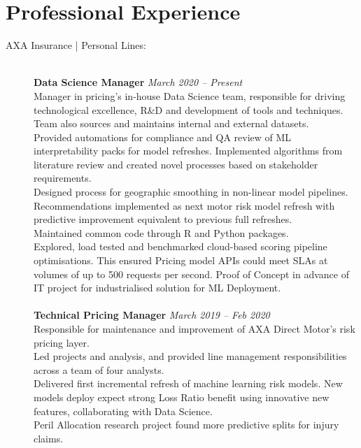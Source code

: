 \documentclass[11pt]{article}
\begin{document}
\section*{Professional Experience}
\begin{description}

\item[AXA Insurance | Personal Lines:] \hspace{1mm} \\
\textbf{Data Science Manager} \emph{March 2020 -- Present}\\
\textbullet \quad Manager in pricing's in-house Data Science team, responsible for driving technological excellence, R\&D and development of tools and techniques. Team also sources and maintains internal and external datasets. \\
\textbullet \quad Provided automations for compliance and QA review of ML interpretability packs for model refreshes. Implemented algorithms from literature review and created novel processes based on stakeholder requirements. \\
\textbullet \quad Designed process for geographic smoothing in non-linear model pipelines. Recommendations implemented as next motor risk model refresh with predictive improvement equivalent to previous full refreshes.\\
\textbullet \quad Maintained common code through R and Python packages. \\
\textbullet \quad Explored, load tested and benchmarked cloud-based scoring pipeline optimisations. This ensured Pricing model APIs could meet SLAs at volumes of up to 500 requests per second. Proof of Concept in advance of IT project for industrialised solution for ML Deployment.
\\\\
\textbf{Technical Pricing Manager} \emph{March 2019 -- Feb 2020}\\
\textbullet \quad Responsible for maintenance and improvement of AXA Direct Motor's risk pricing layer.\\
\textbullet \quad Led projects and analysis, and provided line management responsibilities across a team of four analysts.\\
\textbullet \quad Delivered first incremental refresh of machine learning risk models. New models deploy expect strong Loss Ratio benefit using innovative new features, collaborating with Data Science.\\
\textbullet \quad Peril Allocation research project found more predictive splits for injury claims.\\

\end{description}
\end{document}
